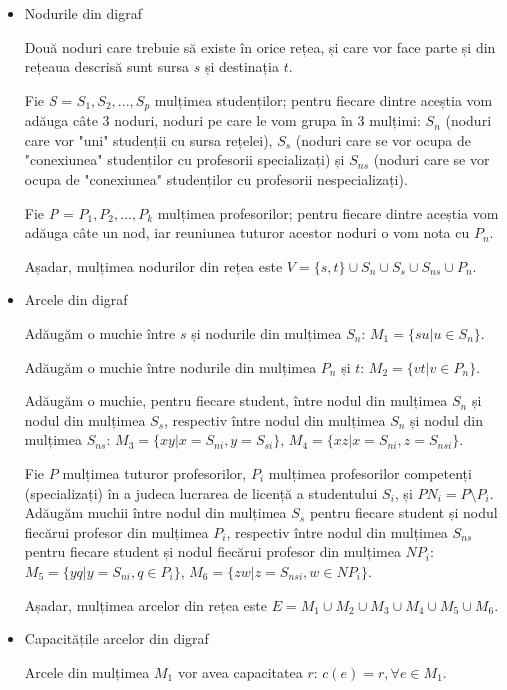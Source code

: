 \documentclass[a4paper,12pt]{article}
\begin{document}
\begin{itemize}
	\item Nodurile din digraf
	
	Două noduri care trebuie să existe în orice rețea, și care vor face parte și din rețeaua descrisă sunt sursa $s$ și destinația $t$.
	
	Fie \textit{S} = ${S_1,S_2,...,S_p}$ mulțimea studenților; pentru fiecare dintre aceștia vom adăuga câte 3 noduri, noduri pe care le vom grupa în 3 mulțimi: $S_n$ (noduri care vor "uni" studenții cu sursa rețelei), $S_s$ (noduri care se vor ocupa de "conexiunea" studenților cu profesorii specializați) și $S_{ns}$ (noduri care se vor ocupa de "conexiunea" studenților cu profesorii nespecializați).
	
	Fie \textit{P} = ${P_1,P_2,...,P_k}$ mulțimea profesorilor; pentru fiecare dintre aceștia vom adăuga câte un nod, iar reuniunea tuturor acestor noduri o vom nota cu $P_n$.
	
	Așadar, mulțimea nodurilor din rețea este $V = \{s,t\} \cup S_n \cup S_s \cup S_{ns} \cup P_n$.
	
	\item Arcele din digraf
	
	Adăugăm o muchie între $s$ și nodurile din mulțimea $S_n$: $M_1 = \{su | u \in S_n \}$.
	
	Adăugăm o muchie între nodurile din mulțimea $P_n$ și $t$: $M_2 = \{vt | v \in P_n\}$.
	
	Adăugăm o muchie, pentru fiecare student, între nodul din mulțimea $S_n$ și nodul din mulțimea $S_s$, respectiv între nodul din mulțimea $S_n$ și nodul din mulțimea $S_{ns}$: $M_3 = \{xy | x = S_{ni}, y = S_{si}\}$, $M_4 = \{xz | x = S_{ni}, z = S_{nsi}\}$.
	
	Fie $P$ mulțimea tuturor profesorilor, $P_i$ mulțimea profesorilor competenți (specializați) în a judeca lucrarea de licență a studentului $S_i$, și $PN_i = P \setminus P_i$. Adăugăm muchii între nodul din mulțimea $S_s$ pentru fiecare student și nodul fiecărui profesor din mulțimea $P_i$, respectiv între nodul din mulțimea $S_{ns}$ pentru fiecare student și nodul fiecărui profesor din mulțimea $NP_i$: $M_5 = \{yq | y = S_{ni}, q \in P_i\}$, $M_6 = \{zw | z = S_{nsi}, w \in NP_i\}$.
	
	Așadar, mulțimea arcelor din rețea este $E = M_1 \cup M_2 \cup M_3 \cup M_4 \cup M_5 \cup M_6$.
	
	\item Capacitățile arcelor din digraf
	
	Arcele din mulțimea $M_1$ vor avea capacitatea $r$: $c(e) = r, \forall e \in M_1$.
	

\end{itemize}
\end{document}
